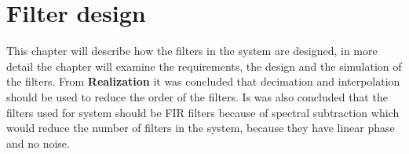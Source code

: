 \chapter{Filter design}
This chapter will describe how the filters in the system are designed, in more detail the chapter will examine the requirements, the design and the simulation of the filters. From \textbf{Realization} it was concluded that decimation and interpolation should be used to reduce the order of the filters.  
Is was also concluded that the filters used for system should be FIR filters because of spectral subtraction which would reduce the number of filters in the system, because they have linear phase and no noise.
   




%

%

%
